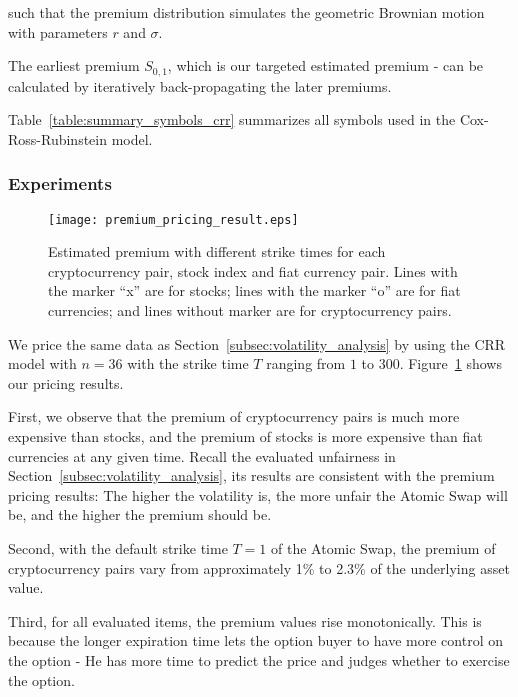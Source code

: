 such that the premium distribution simulates the geometric Brownian motion  with parameters $r$ and $\sigma$.

The earliest premium $S_{0, 1}$, which is our targeted estimated premium - can be calculated by iteratively back-propagating the later premiums.

Table~\ref{table:summary_symbols_crr} summarizes all symbols used in the Cox-Ross-Rubinstein model. 

\subsubsection{Experiments}

\begin{figure}
    \texttt{[image: premium\_pricing\_result.eps]}
    \caption{Estimated premium with different strike times for each cryptocurrency pair, stock index and fiat currency pair. Lines with the marker ``x'' are for stocks; lines with the marker ``o'' are for fiat currencies; and lines without marker are for cryptocurrency pairs.}
    \label{fig:premium_pricing_result}
\end{figure}

We price the same data as Section~\ref{subsec:volatility_analysis} by using the CRR model with $n = 36$ with the strike time $T$ ranging from $1$ to $300$.
Figure~\ref{fig:premium_pricing_result} shows our pricing results.

First, we observe that the premium of cryptocurrency pairs is much more expensive than stocks, and the premium of stocks is more expensive than fiat currencies at any given time.
Recall the evaluated unfairness in Section~\ref{subsec:volatility_analysis}, its results are consistent with the premium pricing results: The higher the volatility is, the more unfair the Atomic Swap will be, and the higher the premium should be.

Second, with the default strike time $T = 1$ of the Atomic Swap, the premium of cryptocurrency pairs vary from approximately 1\% to 2.3\% of the underlying asset value.

Third, for all evaluated items, the premium values rise monotonically.
This is because the longer expiration time lets the option buyer to have more control on the option - He has more time to predict the price and judges whether to exercise the option.